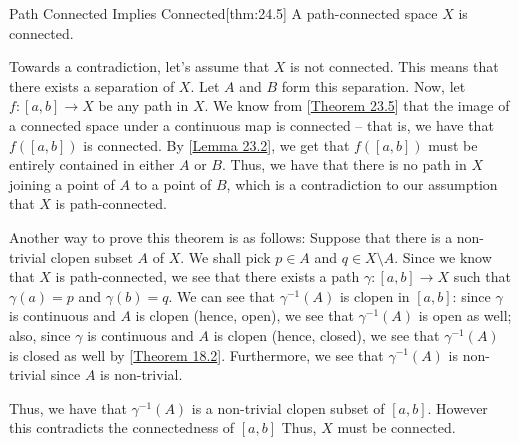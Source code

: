 \begin{thmBox}{Path Connected Implies Connected}[thm:24.5]
    A path-connected space \( X \) is connected.

    \baseRule

    \begin{proofBox}
        Towards a contradiction, let's assume that \( X \) is not connected.
        This means that there exists a separation of \( X \).
        Let \( A \) and \( B \) form this separation.
        Now, let \( f: [ a, b ] \rightarrow X \) be any path in \( X \).
        We know from [\hyperlink{thm:23.5}{Theorem 23.5}] that the image of a
        connected space under a continuous map is connected -- that is,
        we have that \( f ( [ a, b ] ) \) is connected.
        By [\hyperlink{lem:23.2}{Lemma 23.2}], we get that \( f ( [ a, b ] ) \)
        must be entirely contained in either \( A \) or \( B \).
        Thus, we have that there is no path in \( X \) joining a point of 
        \( A \) to a point of \( B \), which is a contradiction to our 
        assumption that \( X \) is path-connected.

        \baseRule

        Another way to prove this theorem is as follows:
        Suppose that there is a non-trivial clopen subset \( A \) of \( X \).
        We shall pick \( p \in A \) and \( q \in X \setminus A \).
        Since we know that \( X \) is path-connected, we see that there exists
        a path \( \gamma: [ a, b ] \rightarrow X \) such that 
        \( \gamma ( a ) = p \) and \( \gamma ( b ) = q \).
        We can see that \( \gamma^{ -1 } ( A ) \) is clopen in \( [ a, b ] \):
        since \( \gamma \) is continuous and \( A \) is clopen (hence, open), 
        we see that \( \gamma^{ -1 } ( A ) \) is open as well; also, since
        \( \gamma \) is continuous and \( A \) is clopen (hence, closed), we 
        see that \( \gamma^{ -1 } ( A ) \) is closed as well by 
        [\hyperlink{thm:18.2}{Theorem 18.2}].
        Furthermore, we see that \( \gamma^{ -1 } ( A ) \) is non-trivial
        since \( A \) is non-trivial. 
        
        \baseSkip

        Thus, we have that \( \gamma^{ -1 } ( A ) \) is a non-trivial clopen
        subset of \( [ a, b ] \).
        However this contradicts the connectedness of \( [ a, b ] \)
        Thus, \( X \) must be connected.
    \end{proofBox}
\end{thmBox}

